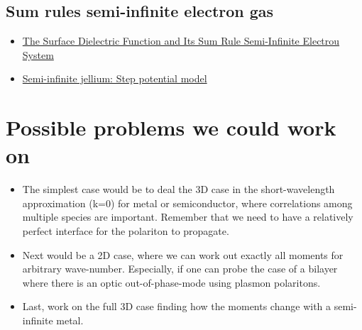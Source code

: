 \documentclass[11pt]{article}
\begin{document}
\subsection{Sum rules semi-infinite electron gas}
\label{sec:org79a090c}

\begin{itemize}
\item \href{./169.pdf}{The Surface Dielectric Function and Its Sum Rule Semi-Infinite Electrou System}

\item \href{./1511.08708.pdf}{Semi-infinite jellium: Step potential model}
\end{itemize}




\section{Possible problems we could work on}
\label{sec:org6014242}

\begin{itemize}
\item The simplest case would be to deal the 3D case in the
short-wavelength approximation (k=0) for metal or semiconductor, where correlations among
multiple species are important. Remember that we need to have a relatively perfect interface for the
polariton to propagate.
\end{itemize}


\begin{itemize}
\item Next would be a 2D case, where we can work out exactly all
moments for arbitrary wave-number. Especially, if one can probe the case of a bilayer where there is an optic
out-of-phase-mode using plasmon polaritons.

\item Last, work on the full 3D case finding how the moments change with a
semi-infinite metal.
\end{itemize}
\end{document}
